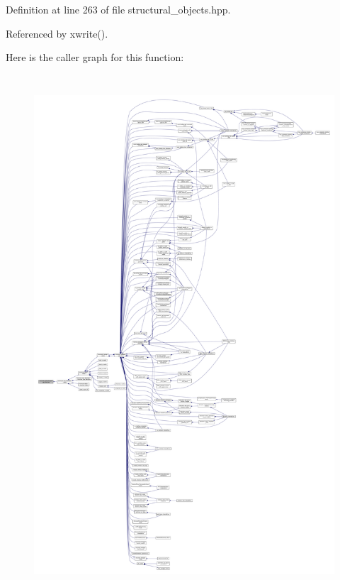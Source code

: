 Definition at line 263 of file structural\+\_\+objects.\+hpp.



Referenced by xwrite().

Here is the caller graph for this function\+:
\nopagebreak
\begin{figure}[H]
\begin{center}
\leavevmode
\includegraphics[height=550pt]{dc/da4/structstructural__type__descriptor_aed5b7adc96acdd6cc4b3030c97c5d9b5_icgraph}
\end{center}
\end{figure}
\mbox{\label{structstructural__type__descriptor_a1eb64dc01fff3ab53fc01588361801f5}} 
